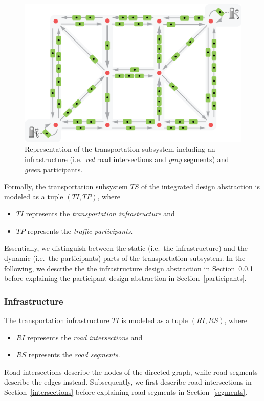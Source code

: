 \begin{figure}[h]
	\begin{center}
	\includegraphics[trim=0 6 0 0, width=.875\columnwidth]{./gfx/transportation_system.png}
	\caption{Representation of the transportation subsystem including an infrastructure (i.e.\ \textit{red} road intersections and \textit{gray} segments) and \textit{green} participants.}
	\label{transport_illustration}
	\end{center}
\end{figure}

Formally, the transportation subsystem $TS$ of the integrated design abstraction is modeled as a tuple $(TI, TP)$, where
\begin{itemize}
	\item $TI$ represents the \textit{transportation infrastructure} and
	\item $TP$ represents the \textit{traffic participants}.
\end{itemize}
Essentially, we distinguish between the static (i.e.\ the infrastructure) and the dynamic (i.e.\ the participants) parts of the transportation subsystem. In the following, we describe the the infrastructure design abstraction in Section~\ref{transport_infrastructure} before explaining the participant design abstraction in Section~\ref{participants}.

\subsubsection{Infrastructure}
\label{transport_infrastructure}

The transportation infrastructure $TI$ is modeled as a tuple $(RI, RS)$, where
\begin{itemize}
	\item $RI$ represents the \textit{road intersections} and
	\item $RS$ represents the \textit{road segments}.
\end{itemize}
Road intersections describe the nodes of the directed graph, while road segments describe the edges instead. Subsequently, we first describe road intersections in Section~\ref{intersections} before explaining road segments in Section~\ref{segments}.


